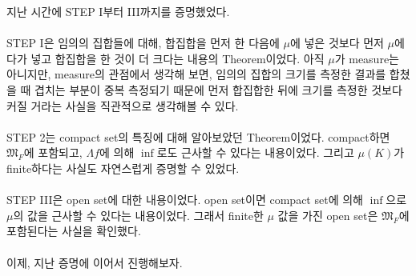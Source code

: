 \documentclass[11pt,reqno]{amsart}
\renewcommand{\(}{\left(}
\renewcommand{\)}{\right)}
\renewcommand{\[}{\left[}
\renewcommand{\]}{\right]}
\newcommand{\M}{\mathfrak{M}}
\begin{document}
지난 시간에 STEP I부터 III까지를 증명했었다.\\ \\
STEP I은 임의의 집합들에 대해, 합집합을 먼저 한 다음에 $\mu$에 넣은 것보다 먼저 $\mu$에다가 넣고 
합집합을 한 것이 더 크다는 내용의 Theorem이었다. 아직 $\mu$가 measure는 아니지만, measure의 
관점에서 생각해 보면, 임의의 집합의 크기를 측정한 결과를 합쳤을 때 겹치는 부분이 중복 측정되기 때문에 
먼저 합집합한 뒤에 크기를 측정한 것보다 커질 거라는 사실을 직관적으로 생각해볼 수 있다. \\ \\
STEP 2는 compact set의 특징에 대해 알아보았던 Theorem이었다. compact하면 $\M_F$에 포함되고, 
$\Lambda f$에 의해 $\inf$로도 근사할 수 있다는 내용이었다. 그리고 $\mu(K)$가 finite하다는 사실도 
자연스럽게 증명할 수 있었다. \\ \\
STEP III은 open set에 대한 내용이었다. open set이면 compact set에 의해 $\inf$으로 $\mu$의 
값을 근사할 수 있다는 내용이었다. 그래서 finite한 $\mu$ 값을 가진 open set은 $\M_F$에 포함된다는 
사실을 확인했다. \\ \\

이제, 지난 증명에 이어서 진행해보자.
\end{document}
